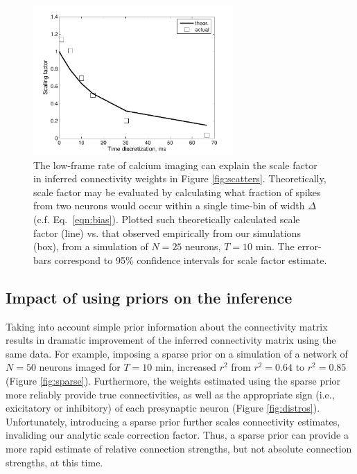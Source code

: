 \begin{figure}[h]
\centering
\includegraphics[width=3in]{../figs/FigureA4_scale_bias}
\caption{The low-frame rate of calcium imaging can explain the scale factor in inferred connectivity weights in Figure \ref{fig:scatters}.  Theoretically, scale factor may be evaluated by calculating what fraction of spikes from two neurons would occur within a single time-bin of width $\Delta$ (c.f. Eq.~\eqref{eqn:bias}).  
Plotted such theoretically calculated scale factor (line) vs. that observed empirically from our simulations (box), from a simulation of $N=25$ neurons, $T=10$ min. The error-bars correspond to 95\% confidence intervals for scale factor estimate.}
\label{fig:bias}
\end{figure}

\subsection{Impact of using priors on the inference}

Taking into account simple prior information about the connectivity matrix results in dramatic improvement of the inferred connectivity matrix using the same data.%
For example, imposing a sparse prior on a simulation of a network of $N=50$ neurons imaged for $T=10$ min, increased $r^2$ from $r^2=0.64$ to $r^2=0.85$ (Figure \ref{fig:sparse}). Furthermore, the weights estimated using the sparse prior more reliably provide true connectivities, as well as the appropriate sign (i.e., exicitatory or inhibitory) of each presynaptic neuron (Figure \ref{fig:distros}). Unfortunately, introducing a sparse prior further scales connectivity estimates, invaliding our analytic scale correction factor.  Thus, a sparse prior can provide a more rapid estimate of relative connection strengths, but not absolute connection strengths, at this time. 

